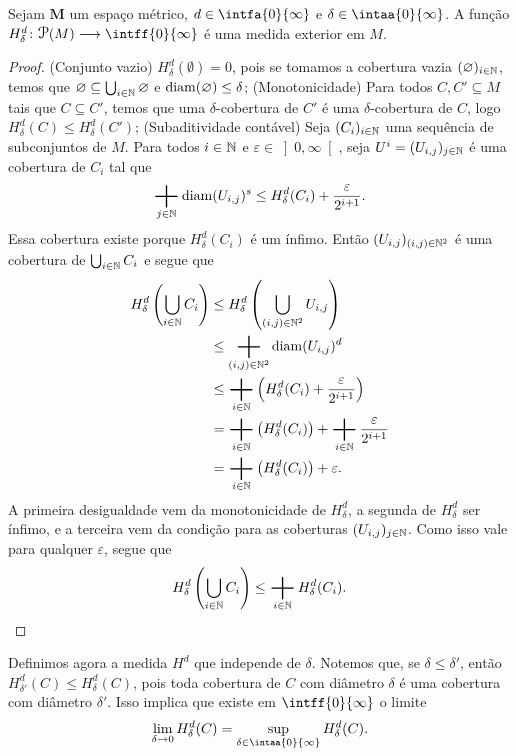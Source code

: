 \begin{prop}
Sejam $\bm M$ um espaço métrico, $d \in \intfa{0}{\infty}$ e $\delta \in \intaa{0}{\infty}$. A função $H^d_\delta\colon \p(M) \to \intff{0}{\infty}$ é uma medida exterior em $M$.
\end{prop}
\begin{proof}
(Conjunto vazio) $H^d_\delta(\emptyset)=0$, pois se tomamos a cobertura vazia $(\varnothing)_{i \in \mathbb{N}}$, temos que $\varnothing \subseteq \bigcup_{i \in \mathbb{N}} \varnothing$ e $\operatorname{diam}(\varnothing)\leq \delta$; (Monotonicidade) Para todos $C,C' \subseteq M$ tais que $C \subseteq C'$, temos que uma $\delta$-cobertura de $C'$ é uma $\delta$-cobertura de $C$, logo $H^d_\delta(C) \leq H^d_\delta(C')$; (Subaditividade contável) Seja $(C_i)_{i \in \mathbb{N}}$ uma sequência de subconjuntos de $M$. Para todos $i \in \mathbb{N}$ e $\varepsilon \in \left]0,\infty\right[$, seja $U^i=(U_{i,j})_{j \in \mathbb{N}}$ é uma cobertura de $C_i$ tal que
	\begin{equation*}
	\sum_{j \in \N} \diam(U_{i,j})^s \leq H^d_\delta(C_i) + \frac{\varepsilon}{2^{i+1}}.
	\end{equation*}
Essa cobertura existe porque $H^d_\delta(C_i)$ é um ínfimo. Então $(U_{i,j})_{(i,j) \in \mathbb{N}^2}$ é uma cobertura de $\bigcup_{i \in \mathbb{N}} C_i$ e segue que
	\begin{align*}
	H^d_\delta\left( \bigcup_{i \in \N} C_i \right) &\leq H^d_\delta\left( \bigcup_{(i,j) \in \N^2} U_{i,j} \right) \\
		&\leq \sum_{(i,j) \in \N^2} \diam(U_{i,j})^d \\
		&\leq \sum_{i \in \N} \left( H^d_\delta(C_i) + \frac{\varepsilon}{2^{i+1}} \right) \\
		&= \sum_{i \in \N} \left( H^d_\delta(C_i)\right) + \sum_{i \in \N}\frac{\varepsilon}{2^{i+1}} \\
		&= \sum_{i \in \N} \left( H^d_\delta(C_i)\right) + \varepsilon.
	\end{align*}
A primeira desigualdade vem da monotonicidade de $H^d_\delta$, a segunda de $H^d_\delta$ ser ínfimo, e a terceira vem da condição para as coberturas $(U_{i,j})_{j \in \mathbb{N}}$. Como isso vale para qualquer $\varepsilon$, segue que
	\begin{equation*}
	H^d_\delta\left( \bigcup_{i \in \N} C_i \right) \leq \sum_{i \in \N} H^d_\delta(C_i). \qedhere
	\end{equation*}
\end{proof}


Definimos agora a medida $H^d$ que independe de $\delta$. Notemos que, se $\delta \leq \delta'$, então $H^d_{\delta'}(C) \leq H^d_\delta(C)$, pois toda cobertura de $C$ com diâmetro $\delta$ é uma cobertura com diâmetro $\delta'$. Isso implica que existe em $\intff{0}{\infty}$ o limite
	\begin{equation*}
	\lim_{\delta \conv 0} H^d_\delta(C) = \sup_{\delta \in \intaa{0}{\infty}} H^d_\delta(C).
	\end{equation*}

